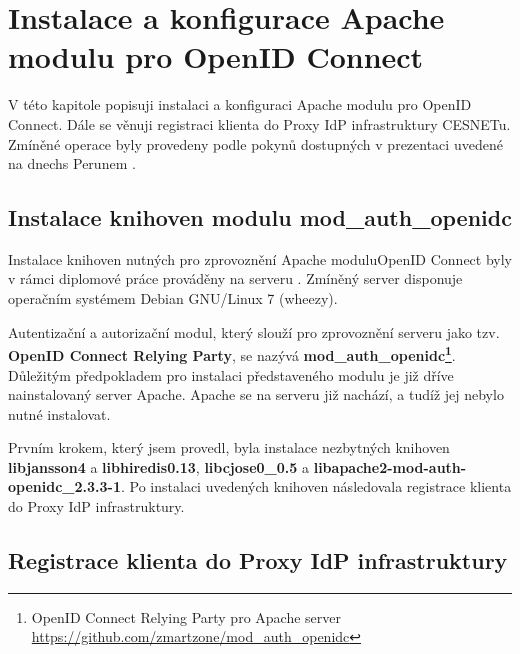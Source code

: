 \documentclass[
  printed, %
  twoside, %
  table,   %
  nolof,     %
  nolot,     %
]{fithesis3}
\begin{document}
\section{Instalace a konfigurace Apache modulu pro OpenID Connect}
\label{apacheInstall}
V této kapitole popisuji instalaci a konfiguraci Apache modulu pro OpenID Connect. Dále se věnuji registraci klienta  do Proxy IdP infrastruktury CESNETu. Zmíněné operace byly provedeny podle pokynů dostupných v prezentaci uvedené na dnech\break s Perunem \cite{oidcConfigPresentation}.

\label{apacheConfig}
\subsection{Instalace knihoven modulu mod\_auth\_openidc}
Instalace knihoven nutných pro zprovoznění Apache modulu\break OpenID Connect byly v rámci diplomové práce prováděny na serveru . Zmíněný server disponuje operačním systémem Debian GNU/Linux 7 (wheezy). 
\par 
Autentizační a autorizační modul, který slouží pro zprovoznění serveru jako tzv. \textbf{OpenID Connect Relying Party}, se nazývá \linebreak \textbf{mod\_auth\_openidc\footnote{OpenID Connect Relying Party pro Apache server \url{https://github.com/zmartzone/mod\_auth\_openidc}}}. Důležitým předpokladem pro instalaci představeného modulu je již dříve nainstalovaný server Apache. Apache se na serveru  již nachází, a tudíž jej nebylo nutné instalovat. 
\par 
Prvním krokem, který jsem provedl, byla instalace nezbytných knihoven \textbf{libjansson4} a \textbf{libhiredis0.13}, \textbf{libcjose0\_0.5} a \textbf{libapache2-mod-auth-openidc\_2.3.3-1}. Po instalaci uvedených knihoven následovala registrace klienta do Proxy IdP infrastruktury. 

\subsection{Registrace klienta do Proxy IdP infrastruktury}
\end{document}
